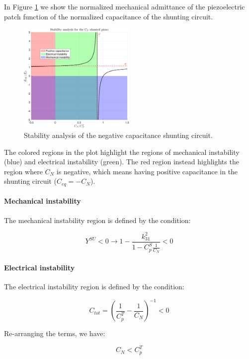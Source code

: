 In Figure \ref{fig:stability_analysis_negative_capacitance} we show the normalized mechanical admittance of the piezoelectric patch function of the normalized capacitance of the shunting circuit.

\begin{figure}[H]
    \centering
    \includegraphics[width=0.5\textwidth]{./img/MATLAB/Stability_analysis_C_N.pdf}
    \caption{Stability analysis of the negative capacitance shunting circuit.}
    \label{fig:stability_analysis_negative_capacitance}
\end{figure}

The colored regions in the plot highlight the regions of mechanical instability (blue) and electrical instability (green).
The red region instead highlights the region where $C_N$ is negative, which means having positive capacitance in the shunting circuit ($C_{eq} = -C_N$).


\paragraph{Mechanical instability}

The mechanical instability region is defined by the condition:

\begin{equation}
    Y^{SU} < 0 \rightarrow 1 - \frac{k_{31}^2}{1 - C_p^S \frac{1}{C_N}} < 0
\end{equation}


\paragraph{Electrical instability}

The electrical instability region is defined by the condition:

\begin{equation}
    C_{tot} = \left( \frac{1}{C_p^T} - \frac{1}{C_N} \right)^{-1} < 0
\end{equation}

Re-arranging the terms, we have:

\begin{equation}
    C_N < C_p^T
\end{equation}


